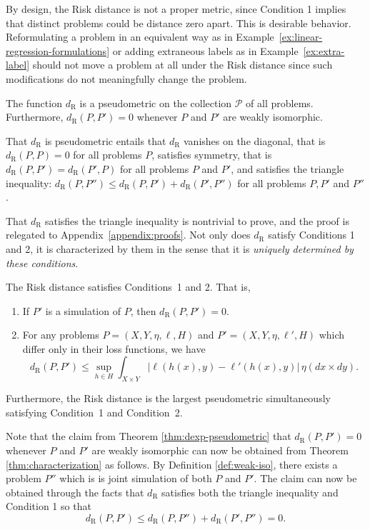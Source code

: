 \documentclass[twoside,11pt]{article}
\newcommand{\dexp}[1][]{d_{\mathrm{R}#1}}
\begin{document}
By design, the Risk distance is not a proper metric, since Condition 1 implies that distinct problems could be distance zero apart. This is desirable behavior. Reformulating a problem in an equivalent way as in Example~\ref{ex:linear-regression-formulations} or adding extraneous labels as in Example~\ref{ex:extra-label} should not move a problem at all under the Risk distance since such modifications do not meaningfully change the problem.


\begin{theorem}\label{thm:dexp-pseudometric}
    The function $\dexp$ is a pseudometric on the collection $\mathcal{P}$ of all problems. Furthermore, $\dexp(P,P')=0$ whenever $P$ and $P'$ are weakly isomorphic.
\end{theorem}

That $\dexp$ is pseudometric entails that $\dexp$ vanishes on the diagonal, that is $\dexp(P,P)=0$ for all problems $P$, satisfies symmetry, that is $\dexp(P,P')=\dexp(P',P)$ for all problems $P$ and $P'$, and satisfies the triangle inequality: $\dexp(P,P'')\leq \dexp(P,P')+\dexp(P',P'')$ for all problems $P,P'$ and $P''$. 

That $\dexp$ satisfies the triangle inequality is nontrivial to prove, and the proof is relegated to Appendix~\ref{appendix:proofs}. Not only does $\dexp$ satisfy Conditions 1 and 2, it is characterized by them in the sense that it is \emph{uniquely determined by these conditions}.
\begin{theorem}\label{thm:characterization}
    The Risk distance satisfies Conditions~1 and 2. That is,
    \begin{enumerate}
        \item If $P'$ is a simulation of $P$, then $\dexp(P,P')=0$.
        \item For any problems $P=(X,Y,\eta,\ell,H)$ and $P'=(X,Y,\eta,\ell',H)$ which differ only in their loss functions, we have \[\dexp(P,P') \leq \sup_{h\in H} \int_{X\times Y}\Big|\ell(h(x),y) - \ell'(h(x),y)\Big| \,\eta(dx\times dy).\]
    \end{enumerate}
    Furthermore, the Risk distance is the largest pseudometric simultaneously satisfying Condition~1 and Condition~2.
\end{theorem}
Note that the claim from Theorem \ref{thm:dexp-pseudometric} that $\dexp(P,P')=0$ whenever $P$
 and $P'$ are weakly isomorphic can now be obtained from Theorem \ref{thm:characterization} as follows. By Definition \ref{def:weak-iso}, there exists a problem  $P''$ which is is joint simulation of both $P$ and $P'$. The claim can now be obtained through  the facts that $\dexp$ satisfies both the triangle inequality and  Condition 1 so that
$$\dexp(P,P')
 \leq \dexp(P,P'')+\dexp(P',P'') = 0. $$
 
\end{document}
